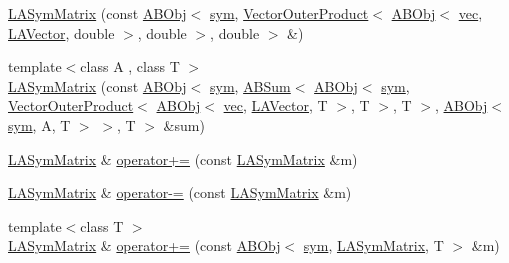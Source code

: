 \begin{DoxyCompactItemize}
\item 
\mbox{\hyperlink{classROOT_1_1Minuit2_1_1LASymMatrix_ab3813da18be7a37100a8f9c7cd49caf3}{L\+A\+Sym\+Matrix}} (const \mbox{\hyperlink{classROOT_1_1Minuit2_1_1ABObj}{A\+B\+Obj}}$<$ \mbox{\hyperlink{classROOT_1_1Minuit2_1_1sym}{sym}}, \mbox{\hyperlink{classROOT_1_1Minuit2_1_1VectorOuterProduct}{Vector\+Outer\+Product}}$<$ \mbox{\hyperlink{classROOT_1_1Minuit2_1_1ABObj}{A\+B\+Obj}}$<$ \mbox{\hyperlink{classROOT_1_1Minuit2_1_1vec}{vec}}, \mbox{\hyperlink{classROOT_1_1Minuit2_1_1LAVector}{L\+A\+Vector}}, double $>$, double $>$, double $>$ \&)
\item 
{\footnotesize template$<$class A , class T $>$ }\\\mbox{\hyperlink{classROOT_1_1Minuit2_1_1LASymMatrix_aed0e1071ce94c05d4b18e7594db9a249}{L\+A\+Sym\+Matrix}} (const \mbox{\hyperlink{classROOT_1_1Minuit2_1_1ABObj}{A\+B\+Obj}}$<$ \mbox{\hyperlink{classROOT_1_1Minuit2_1_1sym}{sym}}, \mbox{\hyperlink{classROOT_1_1Minuit2_1_1ABSum}{A\+B\+Sum}}$<$ \mbox{\hyperlink{classROOT_1_1Minuit2_1_1ABObj}{A\+B\+Obj}}$<$ \mbox{\hyperlink{classROOT_1_1Minuit2_1_1sym}{sym}}, \mbox{\hyperlink{classROOT_1_1Minuit2_1_1VectorOuterProduct}{Vector\+Outer\+Product}}$<$ \mbox{\hyperlink{classROOT_1_1Minuit2_1_1ABObj}{A\+B\+Obj}}$<$ \mbox{\hyperlink{classROOT_1_1Minuit2_1_1vec}{vec}}, \mbox{\hyperlink{classROOT_1_1Minuit2_1_1LAVector}{L\+A\+Vector}}, T $>$, T $>$, T $>$, \mbox{\hyperlink{classROOT_1_1Minuit2_1_1ABObj}{A\+B\+Obj}}$<$ \mbox{\hyperlink{classROOT_1_1Minuit2_1_1sym}{sym}}, A, T $>$ $>$, T $>$ \&sum)
\item 
\mbox{\hyperlink{classROOT_1_1Minuit2_1_1LASymMatrix}{L\+A\+Sym\+Matrix}} \& \mbox{\hyperlink{classROOT_1_1Minuit2_1_1LASymMatrix_a36e303de732b9277e57d27f91bb0d56a}{operator+=}} (const \mbox{\hyperlink{classROOT_1_1Minuit2_1_1LASymMatrix}{L\+A\+Sym\+Matrix}} \&m)
\item 
\mbox{\hyperlink{classROOT_1_1Minuit2_1_1LASymMatrix}{L\+A\+Sym\+Matrix}} \& \mbox{\hyperlink{classROOT_1_1Minuit2_1_1LASymMatrix_acbe82f35c3fc1df7ccda6ab505be41c2}{operator-\/=}} (const \mbox{\hyperlink{classROOT_1_1Minuit2_1_1LASymMatrix}{L\+A\+Sym\+Matrix}} \&m)
\item 
{\footnotesize template$<$class T $>$ }\\\mbox{\hyperlink{classROOT_1_1Minuit2_1_1LASymMatrix}{L\+A\+Sym\+Matrix}} \& \mbox{\hyperlink{classROOT_1_1Minuit2_1_1LASymMatrix_a72081bd71d3b9a665f3480310100eb51}{operator+=}} (const \mbox{\hyperlink{classROOT_1_1Minuit2_1_1ABObj}{A\+B\+Obj}}$<$ \mbox{\hyperlink{classROOT_1_1Minuit2_1_1sym}{sym}}, \mbox{\hyperlink{classROOT_1_1Minuit2_1_1LASymMatrix}{L\+A\+Sym\+Matrix}}, T $>$ \&m)

\end{DoxyCompactItemize}
